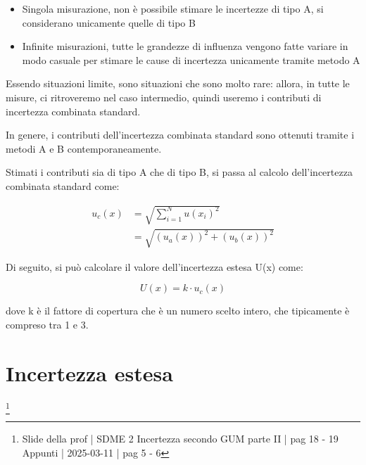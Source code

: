 \begin{itemize}
    \item Singola misurazione, non è possibile stimare le incertezze di tipo A, si considerano unicamente quelle di tipo B 
    \item Infinite misurazioni, tutte le grandezze di influenza vengono fatte variare in modo casuale per stimare le cause di incertezza unicamente tramite metodo A
\end{itemize}

Essendo situazioni limite, sono situazioni che sono molto rare: allora, in tutte le misure, ci ritroveremo nel caso intermedio, 
quindi useremo i contributi di incertezza combinata standard. \newline

In genere, i contributi dell'incertezza combinata standard sono ottenuti tramite i metodi A e B contemporaneamente. \newline 



Stimati i contributi sia di tipo A che di tipo B, si passa al calcolo dell'incertezza combinata standard come: 

{
    \Large 
    \begin{equation}
        \begin{split}
        u_c (x)
        &= 
        \sqrt{\sum_{i = 1}^{N} u(x_i)^{2}}
        \\
        &= 
        \sqrt{(u_a (x))^{2} + (u_b (x))^{2} }
        \end{split}
    \end{equation}
}

Di seguito, si può calcolare il valore dell'incertezza estesa U(x) come: 

{ 
    \Large 
    \begin{equation}
        U (x) = k \cdot u_c (x)
    \end{equation}
}

dove k è il fattore di copertura che è un numero scelto intero, 
che tipicamente è compreso tra 1 e 3. \newline 

\newpage 

\section{Incertezza estesa}
\footnote{Slide della prof | SDME 2 Incertezza secondo GUM parte II | pag 18 - 19 \\  
Appunti | 2025-03-11 | pag 5 - 6}

